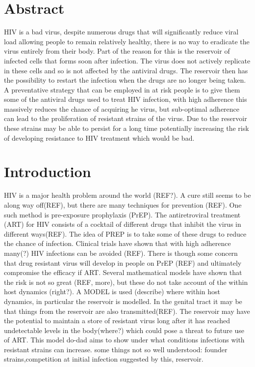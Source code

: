 \documentclass[DIV=15]{scrartcl}
\begin{document}
\section*{Abstract}
HIV is a bad  virus, despite numerous drugs that will significantly reduce viral load allowing people to remain relatively healthy, there is no way to eradicate the virus entirely from their body. Part of the reason for this is the reservoir of  infected cells that forms soon after infection. The virus does not actively replicate in these cells and so is not affected by the antiviral drugs. The reservoir then has the possibility to restart the infection when the drugs are no longer being taken. A preventative strategy that can be employed in at risk people is to give them some of the antiviral drugs used to treat HIV infection, with high adherence this massively reduces the chance of acquiring he virus, but sub-optimal adherence can lead to the proliferation  of resistant strains of the virus. Due to the reservoir these strains may be able to persist for a long time potentially increasing the risk of developing resistance  to HIV treatment which would be bad.

\section{Introduction}
\label{intro}

HIV is a major health problem around  the world (REF?). A cure still seems to be along way off(REF), but there are many techniques for prevention (REF). One such method is pre-exposure prophylaxis (PrEP). The antiretroviral treatment (ART) for HIV consists of a cocktail of different drugs that inhibit the virus in different ways(REF). The idea of PREP is to take some of these drugs to reduce the chance of infection. Clinical trials have shown that with high adherence many(?) HIV infections can be avoided (REF). There is though some concern that drug resistant virus will develop in people on PrEP (REF) and ultimately compromise the efficacy if ART. Several mathematical models have shown that the risk is not so great (REF, more), but these do not take account of the within host dynamics (right?).   A MODEL is used (describe) where within host dynamics, in particular the reservoir is modelled. In the genital tract it may be that things from the reservoir are also transmitted(REF). The reservoir may have  the potential to maintain a store of resistant virus long after it has reached undetectable levels  in the body(where?) which could pose a threat to future use of ART. This model do-dad aims to show under what conditions infections with resistant strains can increase. some things not so well understood: founder strains,competition at initial infection suggested by this,  reservoir.
\end{document}

